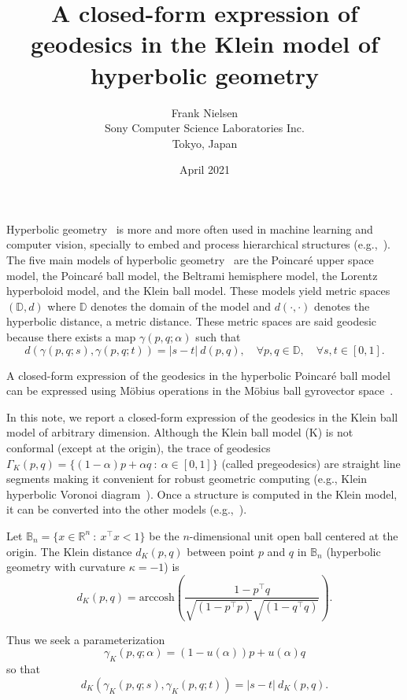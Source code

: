 \documentclass[11pt]{article}
\title{A closed-form expression of geodesics in the Klein model of hyperbolic geometry}
\author{Frank Nielsen\\ Sony Computer Science Laboratories Inc.\\ Tokyo, Japan}
\date{April 2021}
\def\bbR{\mathbb{R}}
\def\bbR{\mathbb{R}}
\def\bbD{\mathbb{D}}
\def\bbB{\mathbb{B}}
\def\arccosh{\mathrm{arccosh}}
\begin{document}
\maketitle

Hyperbolic geometry~\cite{cannon1997hyperbolic} is more and more often used in machine learning and computer vision, specially to embed and process hierarchical structures (e.g.,~\cite{suris2021hyperfuture,shimizu2020hyperbolic}).
The five main models of hyperbolic geometry~\cite{cannon1997hyperbolic} are the Poincar\'e upper space model, the Poincar\'e ball model, the Beltrami hemisphere model, the Lorentz hyperboloid model, and the Klein ball model.
These models yield metric spaces $(\bbD,d)$ where $\bbD$ denotes the domain of the model and $d(\cdot,\cdot)$ denotes the  hyperbolic distance, a metric distance.
These metric spaces are said geodesic because there exists a map $\gamma(p,q;\alpha)$ such that
$$
d\left(\gamma(p,q;s),\gamma(p,q;t)\right) = |s-t|\ d(p,q),\quad \forall p,q\in\bbD,\quad \forall s,t\in [0,1].
$$

A closed-form expression of the geodesics in the hyperbolic Poincar\'e ball model can be expressed
using M\"obius operations in the M\"obius ball gyrovector space~\cite{PoincareGeodesics-2001,shimizu2020hyperbolic}.

In this note, we report a closed-form expression of the geodesics in the Klein ball model of arbitrary dimension.
Although the Klein ball model (K) is not conformal (except at the origin), the trace of  geodesics 
$\Gamma_K(p,q)=\{(1-\alpha)p+\alpha q\ :\ \alpha\in [0,1]\}$ (called pregeodesics)
are straight line segments making it convenient for robust geometric computing (e.g., Klein hyperbolic Voronoi diagram~\cite{HVD-2010,nielsen2012hyperbolic}).
Once a structure is computed in the Klein model, it can be converted into the other models (e.g.,~\cite{HVD-2014}).

Let $\bbB_n=\{ x\in\bbR^n\ :\  x^\top x<1\}$ be the $n$-dimensional unit open ball centered at the origin.
The Klein distance $d_K(p,q)$ between point $p$ and $q$ in $\bbB_n$ (hyperbolic geometry with curvature $\kappa=-1$) is
$$
d_K(p,q)=  \arccosh \left( \frac{1-p^\top q}{\sqrt{(1-p^\top p)}\sqrt{(1-q^\top q)}} \right).
$$

Thus we seek a parameterization 
\begin{equation}
\gamma_K(p,q;\alpha)= (1-u(\alpha)) p + u(\alpha)q
\end{equation}
so that 
$$
d_K\left(\gamma_K(p,q;s),\gamma_K(p,q;t)\right) = |s-t|\ d_K(p,q).
$$
\end{document}
